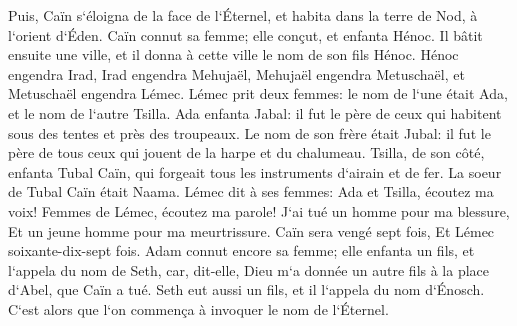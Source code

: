 \verse Puis, Caïn s`éloigna de la face de l`Éternel, et habita dans la terre de Nod, à l`orient d`Éden. 
\verse Caïn connut sa femme; elle conçut, et enfanta Hénoc. Il bâtit ensuite une ville, et il donna à cette ville le nom de son fils Hénoc. 
\verse Hénoc engendra Irad, Irad engendra Mehujaël, Mehujaël engendra Metuschaël, et Metuschaël engendra Lémec. 
\verse Lémec prit deux femmes: le nom de l`une était Ada, et le nom de l`autre Tsilla. 
\verse Ada enfanta Jabal: il fut le père de ceux qui habitent sous des tentes et près des troupeaux. 
\verse Le nom de son frère était Jubal: il fut le père de tous ceux qui jouent de la harpe et du chalumeau. 
\verse Tsilla, de son côté, enfanta Tubal Caïn, qui forgeait tous les instruments d`airain et de fer. La soeur de Tubal Caïn était Naama. 
\verse Lémec dit à ses femmes: Ada et Tsilla, écoutez ma voix! Femmes de Lémec, écoutez ma parole! J`ai tué un homme pour ma blessure, Et un jeune homme pour ma meurtrissure. 
\verse Caïn sera vengé sept fois, Et Lémec soixante-dix-sept fois. 
\verse Adam connut encore sa femme; elle enfanta un fils, et l`appela du nom de Seth, car, dit-elle, Dieu m`a donnée un autre fils à la place d`Abel, que Caïn a tué. 
\verse Seth eut aussi un fils, et il l`appela du nom d`Énosch. C`est alors que l`on commença à invoquer le nom de l`Éternel. 

